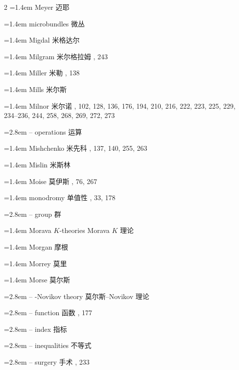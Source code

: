 \begin{multicols}{2}
\noindent\hangindent=1.4em Meyer \quad 迈耶 \par
\noindent\hangindent=1.4em microbundles \quad 微丛 \par
\noindent\hangindent=1.4em Migdal \quad 米格达尔 \par
\noindent\hangindent=1.4em Milgram \quad 米尔格拉姆 , 243\par
\noindent\hangindent=1.4em Miller \quad 米勒 , 138\par
\noindent\hangindent=1.4em Mills \quad 米尔斯 \par
\noindent\hangindent=1.4em Milnor \quad 米尔诺 , 102, 128, 136, 176, 194, 210, 216, 222, 223, 225, 229, 234--236, 244, 258, 268, 269, 272, 273\par
\noindent\hangindent=2.8em -- operations \quad 运算 \par
\noindent\hangindent=1.4em Mishchenko \quad 米先科 , 137, 140, 255, 263\par
\noindent\hangindent=1.4em Mislin \quad 米斯林 \par
\noindent\hangindent=1.4em Moise \quad 莫伊斯 , 76, 267\par
\noindent\hangindent=1.4em monodromy \quad 单值性 , 33, 178\par
\noindent\hangindent=2.8em -- group \quad 群 \par
\noindent\hangindent=1.4em Morava $K$-theories \quad Morava $K$ 理论 \par
\noindent\hangindent=1.4em Morgan \quad 摩根 \par
\noindent\hangindent=1.4em Morrey \quad 莫里 \par
\noindent\hangindent=1.4em Morse \quad 莫尔斯 \par
\noindent\hangindent=2.8em -- -Novikov theory \quad 莫尔斯--Novikov 理论 \par
\noindent\hangindent=2.8em -- function \quad 函数 , 177\par
\noindent\hangindent=2.8em -- index \quad 指标 \par
\noindent\hangindent=2.8em -- inequalities \quad 不等式 \par
\noindent\hangindent=2.8em -- surgery \quad 手术 , 233\par

\end{multicols}
